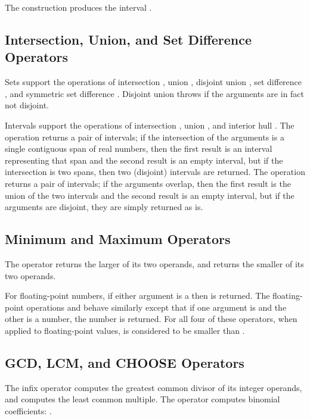 The construction  produces the interval .

\subsection{Intersection, Union, and Set Difference Operators}

Sets support the operations of intersection \EXP{\cap}, union
\EXP{\cup}, disjoint union \EXP{\uplus},
set difference \EXP{\setminus}, and symmetric set difference
\EXP{\ominus}.  Disjoint union
throws  if the arguments are in fact not disjoint.

Intervals support the operations of intersection \EXP{\cap}, union
\EXP{\cup}, and interior hull \EXP{\underline{\union}}.
The operation \EXP{\Cap} returns a pair of intervals; if the intersection of
the arguments is a single contiguous span of real numbers, then the first result is an
interval representing that span and the second result is an empty interval,
but if the intersection is two spans, then two (disjoint) intervals are returned.
The operation \EXP{\Cup} returns a pair of intervals; if the arguments overlap, then
the first result is the union of the two intervals and the second result is an empty interval,
but if the arguments are disjoint, they are simply returned as is.

\subsection{Minimum and Maximum Operators}

The operator  returns the larger of its two operands,
and  returns the smaller of its two operands.

For floating-point numbers, if either argument is a  then
 is returned.  The floating-point operations  and
behave similarly except that if one argument is  and the
other is a number, the number is returned.  For all four of these
operators, when applied to floating-point values,
 is considered to be smaller than .

\subsection{GCD, LCM, and CHOOSE Operators}

The infix operator  computes the greatest common
divisor of its integer operands, and  computes the least
common multiple.  The operator  computes binomial
coefficients:
.

